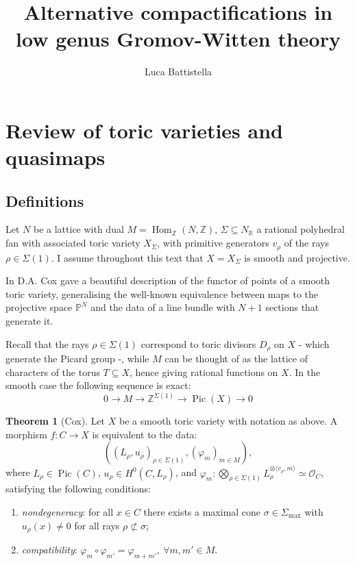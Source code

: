 \documentclass[11pt]{amsart}
\title[Thesis]{Alternative compactifications in low genus Gromov-Witten theory}
\author{Luca Battistella}
\newcommand{\PP}{\mathbb P}
\newcommand{\OO}{\mathcal{O}}
\renewcommand{\to}{\rightarrow}
\newcommand{\Pic}{\operatorname{Pic}}
\newcommand{\Hom}{\operatorname{Hom}}
\newcommand{\ZZ}{\mathbb{Z}}
\newcommand{\RR}{\mathbb{R}}
\theoremstyle{definition}
\newtheorem{thm}{Theorem}[section]
\theoremstyle{definition}
\newcommand{\ilemph}[1]{\emph{#1}}
\begin{document}
\maketitle
\appendixtitletocoff
\tableofcontents

\section{Review of toric varieties and quasimaps}

\subsection{Definitions} Let $N$ be a lattice with dual $M=\Hom_{\ZZ}(N,\ZZ)$, $\Sigma\subseteq N_{\RR}$ a rational polyhedral fan with associated toric variety $X_{\Sigma}$, with primitive generators $v_{\rho}$ of the rays $\rho\in\Sigma(1)$. I assume throughout this text that $X=X_{\Sigma}$ is smooth and projective.

In \cite{CoxFunctor} D.A. Cox gave a beautiful description of the functor of points of a smooth toric variety, generalising the well-known equivalence between maps to the projective space $\PP^N$ and the data of a line bundle with $N+1$ sections that generate it.

Recall that the rays $\rho\in\Sigma(1)$ correspond to toric divisors $D_{\rho}$ on $X$ - which generate the Picard group -, while $M$ can be thought of as the lattice of characters of the torus $T\subseteq X$, hence giving rational functions on $X$. In the smooth case the following sequence is exact:
\begin{equation}\label{eq:toric_Pic_es} 0\to M\to \ZZ^{\Sigma(1)}\to \Pic(X)\to 0\end{equation}

\begin{thm}[Cox]
 Let $X$ be a smooth toric variety with notation as above. A morphism $f\colon C\to X$ is equivalent to the data:
 \[\left((L_\rho,u_\rho)_{\rho\in\Sigma(1)},(\varphi_m)_{m\in M}\right),\]
 where $L_\rho\in\Pic(C)$, $u_\rho\in H^0(C,L_\rho)$, and $\varphi_m\colon \bigotimes_{\rho\in\Sigma(1)}L_\rho^{\otimes \langle v_\rho, m\rangle}\simeq \OO_C$, satisfying the following conditions:
 \begin{enumerate}
\item \ilemph{nondegeneracy}: for all $x \in C$ there exists a maximal cone $\sigma \in \Sigma_{\operatorname{max}}$ with $u_\rho(x) \neq 0$ for all rays $\rho \not\subset \sigma$;
\item \ilemph{compatibility}: $\varphi_m\circ\varphi_{m'}=\varphi_{m+m'},\ \forall m,m'\in M$.
\end{enumerate}
\end{thm}
\end{document}
